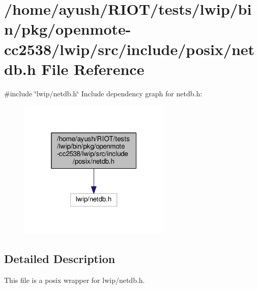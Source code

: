 \hypertarget{openmote-cc2538_2lwip_2src_2include_2posix_2netdb_8h}{}\section{/home/ayush/\+R\+I\+O\+T/tests/lwip/bin/pkg/openmote-\/cc2538/lwip/src/include/posix/netdb.h File Reference}
\label{openmote-cc2538_2lwip_2src_2include_2posix_2netdb_8h}
{\ttfamily \#include \char`\"{}lwip/netdb.\+h\char`\"{}}\newline
Include dependency graph for netdb.\+h\+:
\nopagebreak
\begin{figure}[H]
\begin{center}
\leavevmode
\includegraphics[width=205pt]{openmote-cc2538_2lwip_2src_2include_2posix_2netdb_8h__incl}
\end{center}
\end{figure}


\subsection{Detailed Description}
This file is a posix wrapper for lwip/netdb.\+h. 